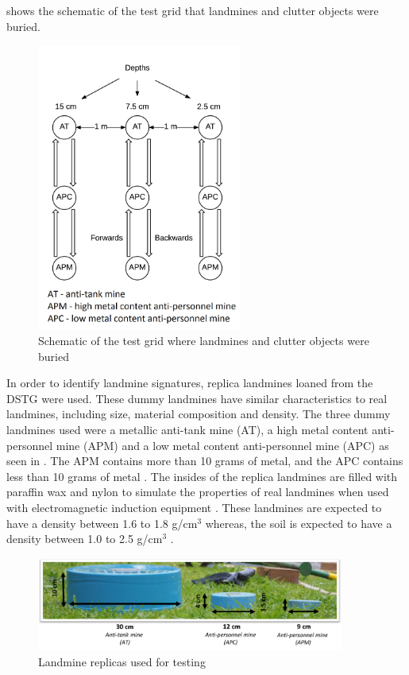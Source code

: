 \documentclass[main.tex]{subfiles}
\begin{document}
 shows the schematic of the test grid that landmines and clutter objects were buried.

\begin{figure}[ht]
\includegraphics[width=0.6\textwidth]{5-Testing/testlane.png}
\centering
\caption[Schematic of test grid]{Schematic of the test grid where landmines and clutter objects were buried}
\end{figure}

In order to identify landmine signatures, replica landmines loaned from the DSTG were used. These dummy landmines have similar characteristics to real landmines, including size, material composition and density. The three dummy landmines used were a metallic anti-tank mine (AT), a high metal content anti-personnel mine (APM) and a low metal content anti-personnel mine (APC) as seen in . The APM contains more than 10 grams of metal, and the APC contains less than 10 grams of metal \parencite{chant2005dsto}. The insides of the replica landmines are filled with paraffin wax and nylon to simulate the properties of real landmines when used with electromagnetic induction equipment \parencite{chant2005dsto}. These landmines are expected to have a density between 1.6 to 1.8 g/cm$^3$ whereas, the soil is expected to have a density between 1.0 to 2.5 g/cm$^3$ \parencite{das2002soil}.		
\begin{figure}[ht]
\includegraphics[width=0.9\textwidth]{5-Testing/dummy.PNG}
\centering
\caption{Landmine replicas used for testing }
\end{figure}
%
%
%
\end{document}
